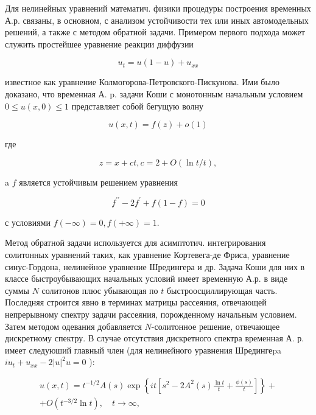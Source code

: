 \documentclass[10pt]{article}
\begin{document}
Для нелинейных уравнений математич. физики процедуры построения временных А.р. связаны, в основном, с анализом устойчивости тех или иных автомодельных решений, а также с методом обратной задачи. Примером первого подхода может служить простейшее уравнение реакции диффузии



\[

u_{t}=u(1-u)+u_{x x}

\]



известное как уравнение Колмогорова-Петровского-Пискунова. Ими было доказано, что временная А. p. задачи Коши с монотонным начальным условием $0 \leqslant u(x, 0) \leqslant 1$ представляет собой бегущую волну



\[

u(x, t)=f(z)+o(1)

\]



где



\[

z=x+c t, c=2+O(\ln t / t),

\]



a $f$ является устойчивым решением уравнения



\[

f^{\prime \prime}-2 f^{\prime}+f(1-f)=0

\]



с условиями $f(-\infty)=0, f(+\infty)=1$.



Метод обратной задачи используется для асимптотич. интегрирования солитонных уравнений таких, как уравнение Кортевега-де Фриса, уравнение синус-Гордона, нелинейное уравнение Шредингера и др. Задача Коши для них в классе быстроубывающих начальных условий имеет временную А.р. в виде суммы $N$ солитонов плюс убывающая по $t$ быстроосциллирующая часть. Последняя строится явно в терминах матрицы рассеяния, отвечающей непрерывному спектру задачи рассеяния, порожденному начальным условием. Затем методом одевания добавляется $N$-солитонное решение, отвечающее дискретному спектру. В случае отсутствия дискретного спектра временная А. р. имеет следуюший главный член (для нелинейного уравнения Шредингеpa $i u_{t}+u_{x x}-2|u|^{2} u=0$ ):



\[

\begin{gathered}

u(x, t)=t^{-1 / 2} A(s) \exp \left\{i t\left[s^{2}-2 A^{2}(s) \frac{\ln t}{t}+\frac{\phi(s)}{t}\right]\right\}+ \\

+O\left(t^{-3 / 2} \ln t\right), \quad t \rightarrow \infty,

\end{gathered}

\]
\end{document}
